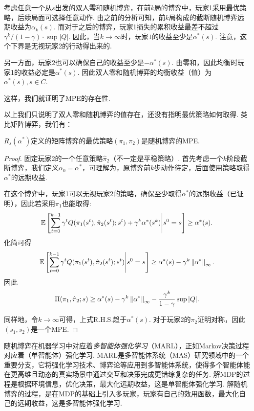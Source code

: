 考虑任意一个从$s$出发的双人零和随机博弈，在前$k$局的博弈中，玩家1采用最优策略，后续局面可选择任意动作. 由之前的分析可知，前$k$局构成的截断随机博弈远期收益为$\alpha_k(s)$. 而对于之后的博弈，玩家1损失的累积收益最差不超过$\gamma^k/(1-\gamma)\cdot \sup|Q|$. 因此，当$k\to\infty$时，玩家$1$的收益至少是$\alpha^*(s)$. 注意，这个下界是无视玩家2的行动得出来的.

另一方面，玩家2也可以确保自己的收益至少是$-\alpha^*(s)$. 由零和，因此均衡时玩家1的收益必定是$\alpha^*(s)$. 因此双人零和随机博弈的均衡收益（值）为$\alpha^*(s),s\in C$.

这样，我们就证明了MPE的存在性. 

以上我们只说明了双人零和随机博弈的值存在，还没有指明最优策略如何取得. 类比矩阵博弈，我们有：
\begin{theorem}
$R_s(\alpha^*)$定义的矩阵博弈的最优策略$(\pi_1,\pi_2)$是随机博弈的MPE. 
\end{theorem}
\begin{proof}
固定玩家2的一个任意策略$\hat{\pi}_2$（不一定是平稳策略）. 首先考虑一个$k$阶段截断博弈，我们定义$\alpha_0=\alpha^*$，可理解为，原博弈前$k$步动作待定，后面使用策略取得$\alpha^*$的远期收益.

在这个博弈中，玩家1可以无视玩家2的策略，确保至少取得$\alpha^*$的远期收益（已证明），因此若采用$\pi_1$也能取得:
\[\mathbb{E}\left[\sum_{t=0}^{k-1}\gamma^tQ(\pi_1(s^t),\hat{\pi}_2(s^t);s^t)+\gamma^k\alpha^*(s^k)\middle|s^0=s\right]\ge \alpha^*(s).\]
化简可得
\[\mathbb{E}\left[\sum_{t=0}^{k-1}\gamma^tQ(\pi_1(s^t),\hat{\pi}_2(s^t);s^t)\middle|s^0=s\right]\ge \alpha^*(s)-\gamma^k\left\|\alpha^*\right\|_\infty.\]
因此
\[\Pi(\pi_1,\hat{\pi}_2;s)\ge \alpha^*(s) - \gamma^k\left\|\alpha^*\right\|_\infty - \frac{\gamma^k}{1-\gamma}\sup|Q|.\]

同样地，令$k\to\infty$可得，上式R.H.S.趋于$\alpha^*(s)$. 对于玩家2的$\pi_2$证明对称，因此$(s_1,s_2)$是一个MPE.
\end{proof}

随机博弈在机器学习中对应着\emph{多智能体强化学习}（MARL），正如Markov决策过程对应着（单智能体）强化学习. MARL是多智能体系统（MAS）研究领域中的一个重要分支，它将强化学习技术、博弈论等应用到多智能体系统，使得多个智能体能在更高维且动态的真实场景中通过交互和决策完成更错综复杂的任务. 解MDP的过程是根据环境信息，优化决策，最大化远期收益，这是单智能体强化学习. 解随机博弈的过程，是在MDP的基础上引入多玩家，玩家有自己的效用函数，最大化自己的远期收益，这是多智能体强化学习. 

\endgroup